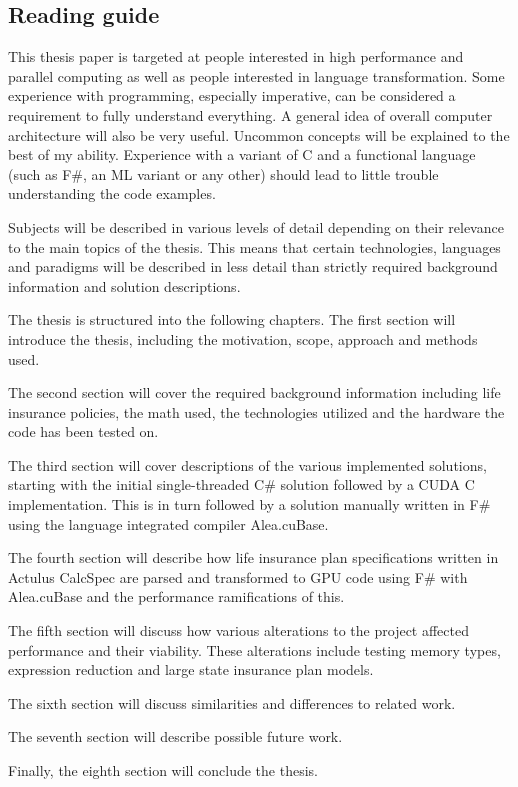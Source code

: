 \subsection{Reading guide}
This thesis paper is targeted at people interested in high performance and parallel computing as well as people interested in language transformation. 
Some experience with programming, especially imperative, can be considered a requirement to fully understand everything. 
A general idea of overall computer architecture will also be very useful. 
Uncommon concepts will be explained to the best of my ability. 
Experience with a variant of C and a functional language (such as F\#, an ML variant or any other) should lead to little trouble understanding the code examples.

Subjects will be described in various levels of detail depending on their relevance to the main topics of the thesis.
This means that certain technologies, languages and paradigms will be described in less detail than strictly required background information and solution descriptions.

The thesis is structured into the following chapters.
The first section will introduce the thesis, including the motivation, scope, approach and methods used.

The second section will cover the required background information including life insurance policies, the math used, the technologies utilized and the hardware the code has been tested on.

The third section will cover descriptions of the various implemented solutions, starting with the initial single-threaded C\# solution followed by a CUDA C implementation. 
This is in turn followed by a solution manually written in F\# using the language integrated compiler Alea.cuBase.

The fourth section will describe how life insurance plan specifications written in Actulus CalcSpec are parsed and transformed to GPU code using F\# with Alea.cuBase and the performance ramifications of this.

The fifth section will discuss how various alterations to the project affected performance and their viability. 
These alterations include testing memory types, expression reduction and large state insurance plan models.

The sixth section will discuss similarities and differences to related work.

The seventh section will describe possible future work.

Finally, the eighth section will conclude the thesis.
